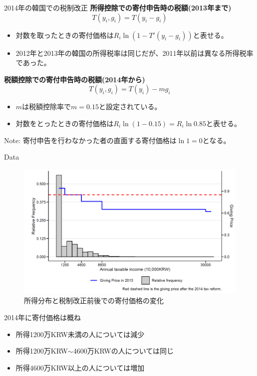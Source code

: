 \documentclass[dvipdfmx,10pt]{beamer}
\begin{document}
	\begin{frame}{2014年の韓国での税制改正}
		\textbf{所得控除での寄付申告時の税額(2013年まで)}
		\[T(y_{i}, g_{i}) = T(y_{i} - g_{i})\]
		
		\begin{itemize}
			\item 対数を取ったときの寄付価格は\(R_{i}\ln(1 - T'(y_{i} - g_{i}))\)と表せる。
			\item 2012年と2013年の韓国の所得税率は同じだが、2011年以前は異なる所得税率であった。
		\end{itemize}
		
		\textbf{税額控除での寄付申告時の税額(2014年から)}
		\[T(y_{i}, g_{i}) = T(y_{i}) - m g_{i}\]
		
		\begin{itemize}
			\item \(m\)は税額控除率で\(m = 0.15\)と設定されている。
			\item 対数をとったときの寄付価格は\(R_{i}\ln(1 - 0.15) = R_{i}\ln 0.85\)と表せる。
		\end{itemize}
		
		Note: 寄付申告を行わなかった者の直面する寄付価格は\(\ln1 =0\)となる。
	\end{frame}

\begin{frame}{Data}
	\begin{figure}
		\centering
		\includegraphics[width=0.7\linewidth]{Fig_Income_distribution}
		\caption{所得分布と税制改正前後での寄付価格の変化}
		\label{fig:2}
	\end{figure}
	\small
	2014年に寄付価格は概ね
	\begin{itemize}
		\item 所得1200万KRW未満の人については減少
		\item 所得1200万KRW$\sim$4600万KRWの人については同じ
		\item 所得4600万KRW以上の人については増加
	\end{itemize}
\end{frame}
	
\end{document}

